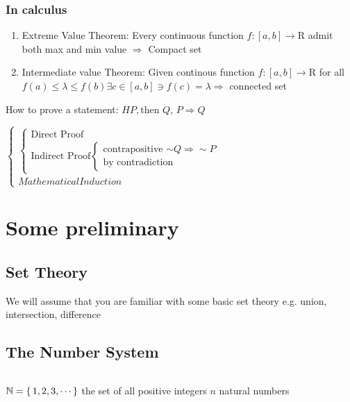 


\cfoot{\thepage} %

\subsubsection{In calculus}

\begin{enumerate}
	\item Extreme Value Theorem: Every continuous function $f:[a,b]\rightarrow\mathrm{R}$ admit both max and min value $\Rightarrow$ Compact set
	\item Intermediate value Theorem: Given continous function $f:[a,b]\rightarrow \mathrm{R}$ for all $f(a) \leq \lambda \leq f(b) \exists c \in [a,b] \ni f(c) = \lambda \Rightarrow$ connected set
\end{enumerate}

How to prove a statement: $H P,$then $Q$, $P \Rightarrow Q$

$\begin{cases}
	\begin{cases}
	\text{Direct Proof}\\\text{Indirect Proof}\begin{cases}\text{contrapositive $\sim Q \Rightarrow \sim P$} \\ \text{by contradiction}\end{cases}
	\end{cases}\\
	Mathematical Induction
\end{cases}$

\section{Some preliminary}

\subsection{Set Theory}

We will assume that you are familiar with some basic set theory e.g. union, intersection, difference

\subsection{The Number System} $ $ 

$\mathbb{N}=\left\{ \,1,2,3,\cdots \,\right\}$ the set of all positive integers $n$ natural numbers

